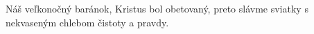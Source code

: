 Náš veľkonočný baránok, Kristus bol obetovaný,
preto slávme sviatky s nekvaseným chlebom čistoty a pravdy.